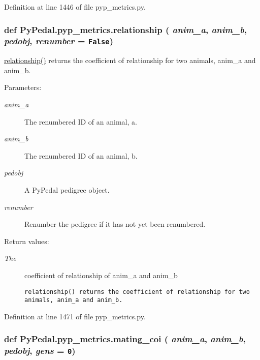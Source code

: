 Definition at line 1446 of file pyp\_\-metrics.py.\hypertarget{namespacePyPedal_1_1pyp__metrics_84284c26af4c946ca9f49657b6d92fcf}{
\subsubsection[relationship]{\setlength{\rightskip}{0pt plus 5cm}def Py\-Pedal.pyp\_\-metrics.relationship ( {\em anim\_\-a},  {\em anim\_\-b},  {\em pedobj},  {\em renumber} = {\tt False})}}
\label{namespacePyPedal_1_1pyp__metrics_84284c26af4c946ca9f49657b6d92fcf}


\hyperlink{namespacePyPedal_1_1pyp__metrics_84284c26af4c946ca9f49657b6d92fcf}{relationship()} returns the coefficient of relationship for two animals, anim\_\-a and anim\_\-b. 

\begin{Desc}
\item[Parameters:]
\begin{description}
\item[{\em anim\_\-a}]The renumbered ID of an animal, a. \item[{\em anim\_\-b}]The renumbered ID of an animal, b. \item[{\em pedobj}]A Py\-Pedal pedigree object. \item[{\em renumber}]Renumber the pedigree if it has not yet been renumbered. \end{description}
\end{Desc}
\begin{Desc}
\item[Return values:]
\begin{description}
\item[{\em The}]coefficient of relationship of anim\_\-a and anim\_\-b

\footnotesize\begin{verbatim}relationship() returns the coefficient of relationship for two
animals, anim_a and anim_b.
\end{verbatim}
\normalsize
 \end{description}
\end{Desc}


Definition at line 1471 of file pyp\_\-metrics.py.\hypertarget{namespacePyPedal_1_1pyp__metrics_41c2baf2ca7fae116732adc32ff3a51b}{
\subsubsection[mating\_\-coi]{\setlength{\rightskip}{0pt plus 5cm}def Py\-Pedal.pyp\_\-metrics.mating\_\-coi ( {\em anim\_\-a},  {\em anim\_\-b},  {\em pedobj},  {\em gens} = {\tt 0})}}
\label{namespacePyPedal_1_1pyp__metrics_41c2baf2ca7fae116732adc32ff3a51b}


